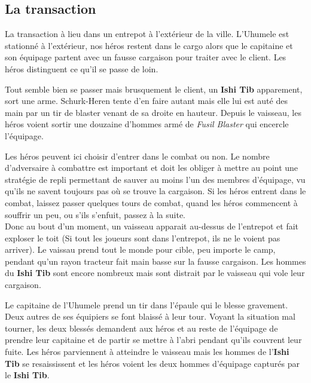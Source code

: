 \subsection{La transaction}

La transaction à lieu dans un entrepot à l’extérieur de la ville. L’Uhumele est stationné à l’extérieur, nos héros restent dans le cargo alors que le capitaine et son équipage partent avec un fausse cargaison pour traiter avec le client. Les héros distinguent ce qu’il se passe de loin.

Tout semble bien se passer mais brusquement le client, un \textbf{Ishi Tib} apparement, sort une arme. Schurk-Heren tente d’en faire autant mais elle lui est auté des main par un tir de blaster venant de sa droite en hauteur. Depuis le vaisseau, les héros voient sortir une douzaine d’hommes armé de \textit{Fusil Blaster} qui encercle l’équipage.

Les héros peuvent ici choisir d’entrer dans le combat ou non. Le nombre d’adversaire à combattre est important et doit les obliger à mettre au point une stratégie de repli permettant de sauver au moins l’un des membres d’équipage, vu qu’ils ne savent toujours pas où se trouve la cargaison. Si les héros entrent dans le combat, laissez passer quelques tours de combat, quand les héros commencent à souffrir un peu, ou s’ils s’enfuit, passez à la suite.\\

Donc au bout d’un moment, un vaisseau apparait au-dessus de l’entrepot et fait exploser le toit (Si tout les joueurs sont dans l’entrepot, ils ne le voient pas arriver). Le vaissau prend tout le monde pour cible, peu importe le camp, pendant qu’un rayon tracteur fait main basse sur la fausse cargaison.
Les hommes du \textbf{Ishi Tib} sont encore nombreux mais sont distrait par le vaisseau qui vole leur cargaison. 

Le capitaine de l’Uhumele prend un tir dans l’épaule qui le blesse gravement. Deux autres de ses équipiers se font blaissé à leur tour. Voyant la situation mal tourner, les deux blessés demandent aux héros et au reste de l’équipage de prendre leur capitaine et de partir se mettre à l’abri pendant qu’ils couvrent leur fuite. Les héros parviennent à atteindre le vaisseau mais les hommes de l’\textbf{Ishi Tib} se resaississent et les héros voient les deux hommes d’équipage capturés par le \textbf{Ishi Tib}.

